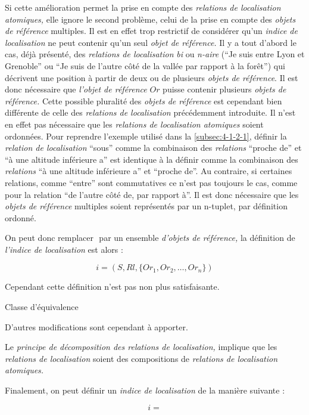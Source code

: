 Si cette amélioration permet la prise en compte des \emph{relations de
  localisation atomiques,} elle ignore le second problème, celui de la
prise en compte des \emph{objets de référence} multiples. Il est en
effet trop restrictif de considérer qu'un \emph{indice de
  localisation} ne peut contenir qu'un seul \emph{objet de référence.}
Il y a tout d'abord le cas, déjà présenté, des \emph{relations de
  localisation} \emph{bi} ou \emph{n-aire} (\eg \enquote{Je suis entre
  Lyon et Grenoble} ou \enquote{Je suis de l'autre côté de la vallée
  par rapport à la forêt}) qui décrivent une position à partir de deux
ou de plusieurs \emph{objets de référence}. Il est donc nécessaire que
\emph{l'objet de référence} \(Or\) puisse contenir plusieurs
\emph{objets de référence.} Cette possible pluralité des \emph{objets
  de référence} est cependant bien différente de celle des
\emph{relations de localisation} précédemment introduite. Il n'est en
effet pas nécessaire que les \emph{relations de localisation
  atomiques} soient ordonnées. Pour reprendre l'exemple utilisé dans
la \autoref{subsec:4-1-2-1}, définir la \emph{relation de
  localisation} \enquote{sous} comme la combinaison des
\emph{relations} \enquote{proche de} et \enquote{à une altitude
  inférieure a} est identique à la définir comme la combinaison des
\emph{relations} \enquote{à une altitude inférieure a} et
\enquote{proche de}. Au contraire, si certaines relations, comme
\enquote{entre} sont commutatives ce n'est pas toujours le cas, comme
pour la relation \enquote{de l'autre côté de, par rapport à}. Il est
donc nécessaire que les \emph{objets de référence} multiples soient
représentés par un n-tuplet, par définition ordonné.

On peut donc remplacer \(\) par un ensemble \emph{d'objets de
  référence,} la définition de \emph{l'indice de localisation} est
alors :

\begin{equation}
  i = (S, Rl, \{Or_1, Or_2, \ldots, Or_n\})
\end{equation}

Cependant cette définition n'est pas non plus satisfaisante.

Classe d'équivalence


D'autres modifications sont cependant à apporter.

Le \emph{principe de décomposition des relations de localisation,}
implique que les \emph{relations de localisation} soient des
compositions de \emph{relations de localisation atomiques.}



Finalement, on peut définir un \emph{indice de localisation} de la
manière suivante :

\begin{equation}
  i =
\end{equation}

